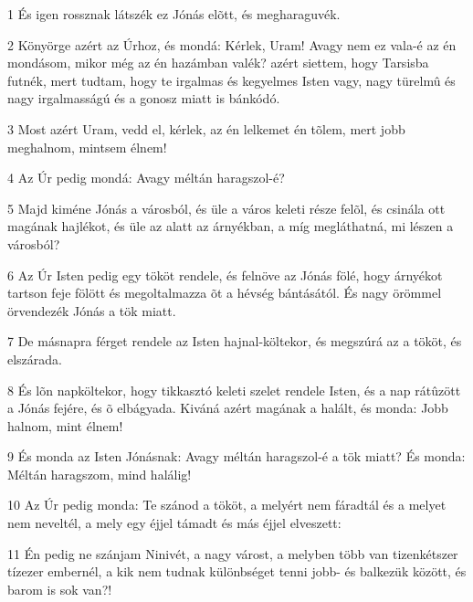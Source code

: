\par 1 És igen rossznak látszék ez Jónás elõtt, és megharaguvék.
\par 2 Könyörge azért az Úrhoz, és mondá: Kérlek, Uram! Avagy nem ez vala-é az én mondásom, mikor még az én hazámban valék? azért siettem, hogy Tarsisba futnék, mert tudtam, hogy te irgalmas és kegyelmes Isten vagy, nagy türelmû és nagy irgalmasságú és a gonosz miatt is bánkódó.
\par 3 Most azért Uram, vedd el, kérlek, az én lelkemet én tõlem, mert jobb meghalnom, mintsem élnem!
\par 4 Az Úr pedig mondá: Avagy méltán haragszol-é?
\par 5 Majd kiméne Jónás a városból, és üle a város keleti része felõl, és csinála ott magának hajlékot, és üle az alatt az árnyékban, a míg megláthatná, mi lészen a városból?
\par 6 Az Úr Isten pedig egy tököt rendele, és felnöve az Jónás fölé, hogy árnyékot tartson feje fölött és megoltalmazza õt a hévség bántásától. És nagy örömmel örvendezék Jónás a tök miatt.
\par 7 De másnapra férget rendele az Isten hajnal-költekor, és megszúrá az a tököt, és elszárada.
\par 8 És lõn napköltekor, hogy tikkasztó keleti szelet rendele Isten, és a nap rátûzött a Jónás fejére, és õ elbágyada. Kiváná azért magának a halált, és monda: Jobb halnom, mint élnem!
\par 9 És monda az Isten Jónásnak: Avagy méltán haragszol-é a tök miatt? És monda: Méltán haragszom, mind halálig!
\par 10 Az Úr pedig monda: Te szánod a tököt, a melyért nem fáradtál és a melyet nem neveltél, a mely egy éjjel támadt és más éjjel elveszett:
\par 11 Én pedig ne szánjam Ninivét, a nagy várost, a melyben több van tizenkétszer tízezer embernél, a kik nem tudnak különbséget tenni jobb- és balkezük között, és barom is sok van?!


